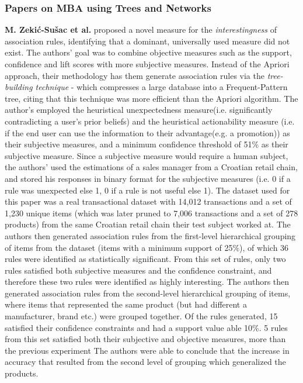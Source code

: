 \documentclass[a4paper,11pt]{article}
\begin{document}
\subsubsection{Papers on MBA using Trees and Networks}
\textbf{M. Zekić-Sušac et al.} \cite{market_ass} proposed a novel measure for the \textit{interestingness} of association rules,  identifying that a dominant, universally used measure did not exist. The authors' goal was to combine objective measures such as the support, confidence and lift scores with more subjective measures. Instead of the Apriori approach, their methodology has them generate association rules via the \textit{tree-building technique} - which compresses a large database into a Frequent-Pattern tree, citing that this technique was more efficient than the Apriori algorithm. The author's employed the heuristical unexpectedness measure(i.e.  significantly contradicting a user's prior beliefs) and the heuristical actionability measure (i.e. if the end user can use the information to their advantage(e.g. a promotion)) as their subjective measures, and a minimum confidence threshold of 51\% as their subjective measure.  Since a subjective measure would require a human subject, the authors' used the estimations of a sales manager from a Croatian retail chain, and stored his responses in binary format for the subjective measures (i.e. 0 if a rule was unexpected else 1, 0 if a rule is not useful else 1). The dataset used for this paper was a real transactional dataset with 14,012 transactions and a set of 1,230 unique items (which was later pruned to 7,006 transactions and a set of 278 products) from the same Croatian retail chain their test subject worked at. The authors then generated association rules from the first-level hierarchical grouping of items from the dataset (items with a minimum support of 25\%),  of which 36 rules were identified as statistically significant.  From this set of rules, only two rules satisfied both subjective measures and the confidence constraint, and therefore these two rules were identified as highly interesting.  The authors then generated association rules from the second-level hierarchical grouping of items, where items that represented the same product (but had different a manufacturer, brand etc.) were grouped together. Of the rules generated, 15 satisfied their confidence constraints and had a support value able 10\%. 5 rules from this set satisfied both their subjective and objective measures,  more than the previous experiment  The authors were able to conclude that the increase in accuracy that resulted from the second level of grouping which generalized the products.\\
\end{document}
